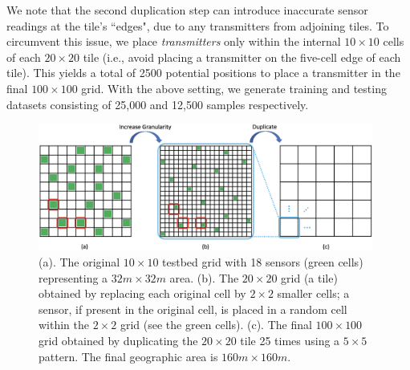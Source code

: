 We note that the second duplication step can introduce inaccurate sensor readings at the tile's ``edges", due to 
any transmitters from adjoining tiles. To circumvent this issue, we place {\em transmitters} only within the internal
$10 \times 10$ cells of each $20 \times 20$ tile (i.e., avoid placing a transmitter on the five-cell edge of each tile). This
yields a total of 2500 potential positions to place a transmitter in the final $100 \times 100$ grid. 
With the above setting, we generate training and testing datasets consisting of 25,000 and 12,500 samples respectively.

\begin{figure}[t]
    \centering
    \includegraphics[width=0.98\textwidth]{chapters/wowmom-pmc/figures/testbed.png}
    \caption{(a). The original $10\times10$ testbed grid with 18 sensors (green cells) representing a $32m \times 32m$ area. (b). The $20\times20$ grid (a tile) obtained by replacing each original cell by $2 \times 2$ smaller cells; a sensor, if present in the original cell, is placed in a random cell within the  $2\times2$ grid (see the green cells). (c). The final $100\times100$ grid obtained by duplicating the $20\times20$ tile 25 times using a $5\times5$ pattern. The final geographic area is $160m\times160m$.}
    \label{fig:testbed}
\end{figure}

